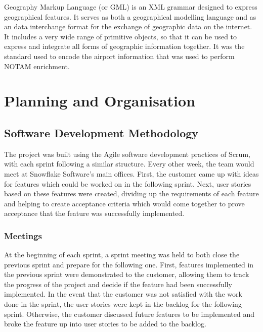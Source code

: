 \documentclass[a4paper, 12pt, twoside]{article}
\begin{document}
Geography Markup Language (or GML) is an XML grammar designed to express geographical features. It serves as both a geographical modelling language and as an data interchange format for the exchange of geographic data on the internet. It includes a very wide range of primitive objects, so that it can be used to express and integrate all forms of geographic information together. It was the standard used to encode the airport information that was used to perform NOTAM enrichment.

\newpage

\section{Planning and Organisation}
\label{sec:planning}

\subsection{Software Development Methodology}
\label{sec:plan_software_development_methodology}

The project was built using the Agile software development practices of Scrum, with each sprint following a similar structure. Every other week, the team would meet at Snowflake Software's main offices. First, the customer came up with ideas for features which could be worked on in the following sprint. Next, user stories based on these features were created, dividing up the requirements of each feature and helping to create acceptance criteria which would come together to prove acceptance that the feature was successfully implemented.

\subsubsection{Meetings}

At the beginning of each sprint, a sprint meeting was held to both close the previous sprint and prepare for the following one. First, features implemented in the previous sprint were demonstrated to the customer, allowing them to track the progress of the project and decide if the feature had been successfully implemented. In the event that the customer was not satisfied with the work done in the sprint, the user stories were kept in the backlog for the following sprint. Otherwise, the customer discussed future features to be implemented and broke the feature up into user stories to be added to the backlog.
\end{document}
